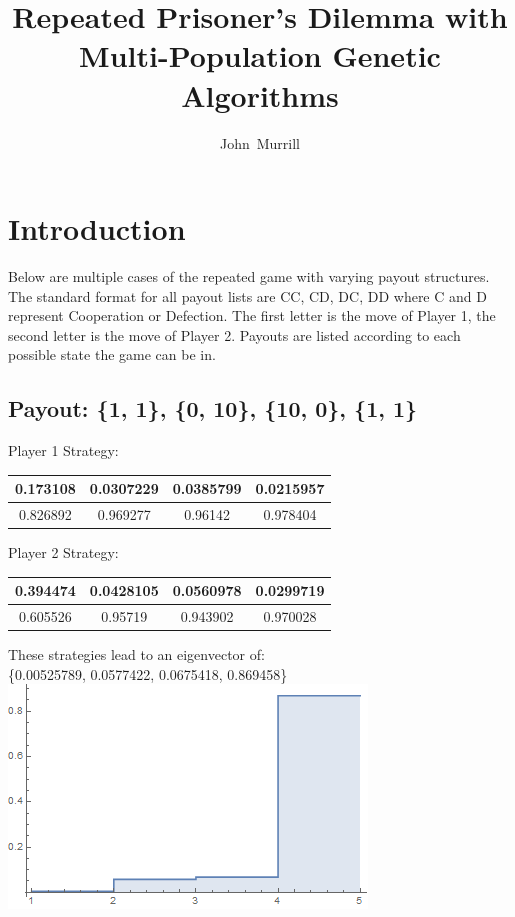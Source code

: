 \documentclass{Article}
\begin{document}
\title{Repeated Prisoner's Dilemma with Multi-Population Genetic Algorithms}
\author{John~Murrill}
\maketitle

\maketitle


\section{Introduction}
Below are multiple cases of the repeated game with varying payout structures. The standard format for all payout lists are CC, CD, DC, DD where C and D represent Cooperation or Defection. The first letter is the move of Player 1, the second letter is the move of Player 2. Payouts are listed according to each possible state the game can be in.

\subsection{Payout: \{1, 1\}, \{0, 10\}, \{10, 0\}, \{1, 1\}}
\begin{center}
Player 1 Strategy: 
  \begin{tabular}{c | c | c | c }
    0.173108 & 0.0307229 & 0.0385799 & 0.0215957 \\ \hline
    0.826892 & 0.969277 & 0.96142 & 0.978404 \\ \hline
  \end{tabular}
\end{center}
\begin{center}
Player 2 Strategy: 
  \begin{tabular}{c | c | c | c }
    0.394474 & 0.0428105 & 0.0560978 & 0.0299719 \\ \hline
    0.605526 & 0.95719 & 0.943902 & 0.970028 \\ \hline
  \end{tabular}
\end{center}
\begin{center}
These strategies lead to an eigenvector of:\\
\{0.00525789, 0.0577422, 0.0675418, 0.869458\}\\
\includegraphics[scale=0.5]{Oneone.png}
\end{center}
\newpage
\end{document}
